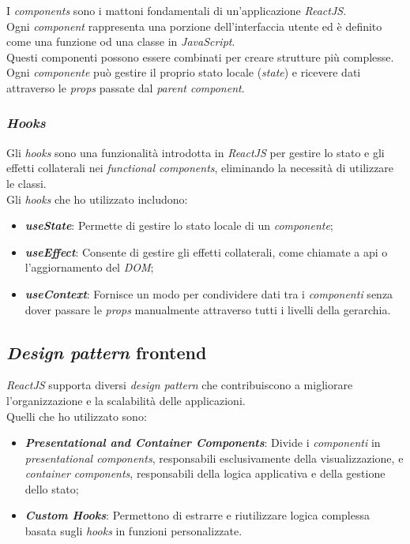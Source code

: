 I \textit{components} sono i mattoni fondamentali di un'applicazione \textit{ReactJS}.\\
Ogni \textit{component} rappresenta una porzione dell'interfaccia utente ed è definito come una funzione od una classe in \textit{JavaScript}.\\
Questi componenti possono essere combinati per creare strutture più complesse.\\
Ogni \textit{componente} può gestire il proprio stato locale (\textit{state}) e ricevere dati attraverso le \textit{props} passate dal \textit{parent component}. \\

\subsubsection{\textit{Hooks}}

Gli \textit{hooks} sono una funzionalità introdotta in \textit{ReactJS} per gestire lo stato e gli effetti collaterali nei \textit{functional components}, eliminando la necessità di utilizzare le classi.\\

\noindent Gli \textit{hooks} che ho utilizzato includono:
\begin{itemize}
    \item \textbf{\textit{useState}}: Permette di gestire lo stato locale di un \textit{componente};
    \item \textbf{\textit{useEffect}}: Consente di gestire gli effetti collaterali, come chiamate a \gls{api} o l'aggiornamento del \textit{DOM};
    \item \textbf{\textit{useContext}}: Fornisce un modo per condividere dati tra i \textit{componenti} senza dover passare le \textit{props} manualmente attraverso tutti i livelli della gerarchia.
\end{itemize}

\subsection*{\textit{Design pattern} frontend}

\textit{ReactJS} supporta diversi \textit{design pattern} che contribuiscono a migliorare l'organizzazione e la scalabilità delle applicazioni. \\
Quelli che ho utilizzato sono:
\begin{itemize}
    \item \textbf{\textit{Presentational and Container Components}}: Divide i \textit{componenti} in \textit{presentational components}, responsabili esclusivamente della visualizzazione, e \textit{container components}, responsabili della logica applicativa e della gestione dello stato;
    \item \textbf{\textit{Custom Hooks}}: Permettono di estrarre e riutilizzare logica complessa basata sugli \textit{hooks} in funzioni personalizzate.
\end{itemize}


